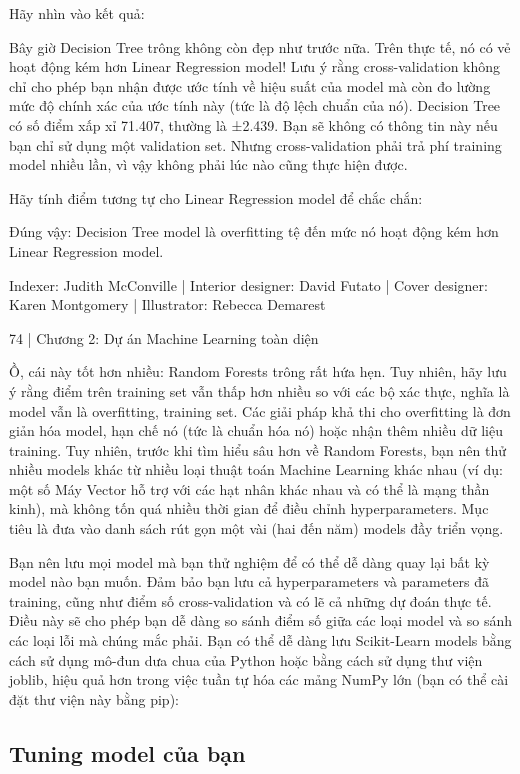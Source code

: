 Hãy nhìn vào kết quả:

Bây giờ Decision Tree trông không còn đẹp như trước nữa. Trên thực tế, nó có vẻ hoạt động kém hơn Linear Regression model! Lưu ý rằng cross-validation không chỉ cho phép bạn nhận được ước tính về hiệu suất của model mà còn đo lường mức độ chính xác của ước tính này (tức là độ lệch chuẩn của nó). Decision Tree có số điểm xấp xỉ 71.407, thường là ±2.439. Bạn sẽ không có thông tin này nếu bạn chỉ sử dụng một validation set. Nhưng cross-validation phải trả phí training model nhiều lần, vì vậy không phải lúc nào cũng thực hiện được.

Hãy tính điểm tương tự cho Linear Regression model để chắc chắn:

Đúng vậy: Decision Tree model là overfitting tệ đến mức nó hoạt động kém hơn Linear Regression model.

Indexer: Judith McConville | Interior designer: David Futato | Cover designer: Karen Montgomery | Illustrator: Rebecca Demarest

74 | Chương 2: Dự án Machine Learning toàn diện

Ồ, cái này tốt hơn nhiều: Random Forests trông rất hứa hẹn. Tuy nhiên, hãy lưu ý rằng điểm trên training set vẫn thấp hơn nhiều so với các bộ xác thực, nghĩa là model vẫn là overfitting, training set. Các giải pháp khả thi cho overfitting là đơn giản hóa model, hạn chế nó (tức là chuẩn hóa nó) hoặc nhận thêm nhiều dữ liệu training. Tuy nhiên, trước khi tìm hiểu sâu hơn về Random Forests, bạn nên thử nhiều models khác từ nhiều loại thuật toán Machine Learning khác nhau (ví dụ: một số Máy Vector hỗ trợ với các hạt nhân khác nhau và có thể là mạng thần kinh), mà không tốn quá nhiều thời gian để điều chỉnh hyperparameters. Mục tiêu là đưa vào danh sách rút gọn một vài (hai đến năm) models đầy triển vọng.

Bạn nên lưu mọi model mà bạn thử nghiệm để có thể dễ dàng quay lại bất kỳ model nào bạn muốn. Đảm bảo bạn lưu cả hyperparameters và parameters đã training, cũng như điểm số cross-validation và có lẽ cả những dự đoán thực tế. Điều này sẽ cho phép bạn dễ dàng so sánh điểm số giữa các loại model và so sánh các loại lỗi mà chúng mắc phải. Bạn có thể dễ dàng lưu Scikit-Learn models bằng cách sử dụng mô-đun dưa chua của Python hoặc bằng cách sử dụng thư viện joblib, hiệu quả hơn trong việc tuần tự hóa các mảng NumPy lớn (bạn có thể cài đặt thư viện này bằng pip):

\subsection{Tuning model của bạn}

